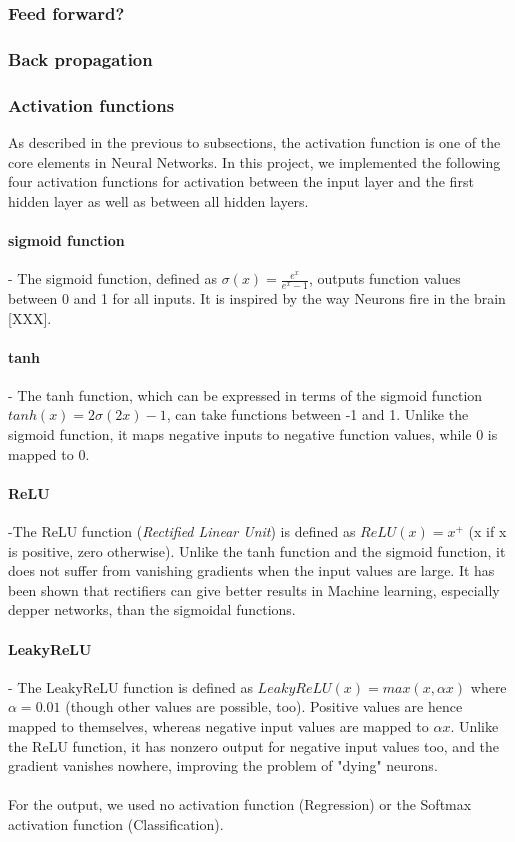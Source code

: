 \documentclass[11pt,a4paper,titlepage]{article}
\begin{document}
\subsubsection{Feed forward?}
\subsubsection{Back propagation}
\subsubsection{Activation functions}
As described in the previous to subsections, the activation function is one of the core elements in Neural Networks. In this project, we implemented the following four activation functions for activation between the input layer and the first hidden layer as well as between all hidden layers. 
\paragraph*{sigmoid function} - The sigmoid function, defined as $\sigma(x)=\frac{e^x}{e^x-1}$, outputs function values between 0 and 1 for all inputs. It is inspired by the way Neurons fire in the brain [XXX].
\paragraph*{tanh} - The tanh function, which can be expressed in terms of the sigmoid function $tanh(x)=2\sigma(2x)-1$, can take functions between -1 and 1. Unlike the sigmoid function, it maps negative inputs to negative function values, while 0 is mapped to 0.
\paragraph*{ReLU} -The ReLU function (\textit{Rectified Linear Unit}) is defined as $ReLU(x)=x^+$ (x if x is positive, zero otherwise). Unlike the tanh function and the sigmoid function, it does not suffer from vanishing gradients when the input values are large. It has been shown \citep{surpremeRELU} that rectifiers can give better results in Machine learning, especially depper networks, than the sigmoidal functions.
\paragraph*{LeakyReLU} - The LeakyReLU function is defined as $LeakyReLU(x)=max(x,\alpha x)$ where $\alpha=0.01$ (though other values are possible, too). Positive values are hence mapped to themselves, whereas negative input values are mapped to $\alpha x$. Unlike the ReLU function, it has nonzero output for negative input values too, and the gradient vanishes nowhere, improving the problem of "dying" neurons.\\\\
For the output, we used no activation function (Regression) or the Softmax activation function (Classification). 
\end{document}
